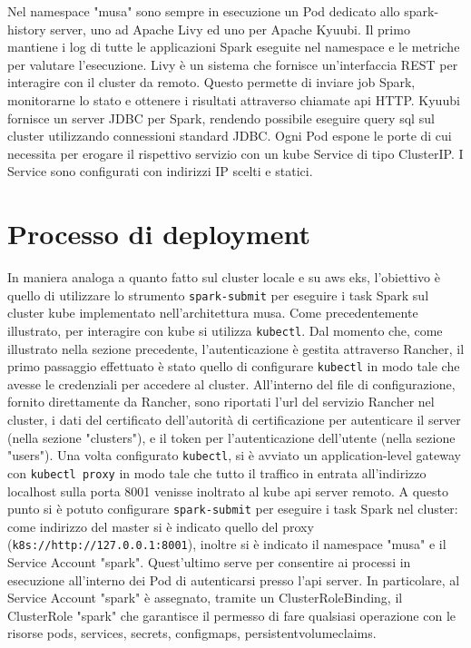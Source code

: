 \documentclass[12pt,a4paper,fleqn,titlepage]{report}
\begin{document}
        Nel namespace "musa" sono sempre in esecuzione un Pod dedicato allo spark-history server, uno ad Apache Livy ed uno per Apache Kyuubi. Il primo mantiene i log di tutte le applicazioni Spark eseguite nel namespace e le metriche per valutare l'esecuzione. Livy è un sistema che fornisce un'interfaccia REST per interagire con il \gls{cluster} da remoto. Questo permette di inviare job Spark, monitorarne lo stato e ottenere i risultati attraverso chiamate \gls{api} HTTP. Kyuubi fornisce un server JDBC per Spark, rendendo possibile eseguire query \gls{sql} sul \gls{cluster} utilizzando connessioni standard JDBC.
        Ogni Pod espone le porte di cui necessita per erogare il rispettivo servizio con un \gls{kube} Service di tipo ClusterIP. I Service sono configurati con indirizzi IP scelti e statici.

    \section{Processo di deployment}\label{sec:deplmusa}
        In maniera analoga a quanto fatto sul \gls{cluster} locale e su \gls{aws} \gls{eks}, l'obiettivo è quello di utilizzare lo strumento \lstinline{spark-submit} per eseguire i task Spark sul \gls{cluster} \gls{kube} implementato nell'architettura \gls{musa}.
        Come precedentemente illustrato, per interagire con \gls{kube} si utilizza \lstinline{kubectl}. Dal momento che, come illustrato nella sezione precedente, l'autenticazione è gestita attraverso Rancher, il primo passaggio effettuato è stato quello di configurare \lstinline{kubectl} in modo tale che avesse le credenziali per accedere al \gls{cluster}. All'interno del file di configurazione, fornito direttamente da Rancher, sono riportati l'\gls{url} del servizio Rancher nel \gls{cluster}, i dati del certificato dell'autorità di certificazione per autenticare il server (nella sezione "clusters"), e il token per l'autenticazione dell'utente (nella sezione "users").
        Una volta configurato \lstinline{kubectl}, si è avviato un application-level gateway con \lstinline{kubectl proxy} in modo tale che tutto il traffico in entrata all'indirizzo localhost sulla porta 8001 venisse inoltrato al \gls{kube} \gls{api} server remoto.
        A questo punto si è potuto configurare \lstinline{spark-submit} per eseguire i task Spark nel \gls{cluster}: come indirizzo del master si è indicato quello del proxy (\lstinline{k8s://http://127.0.0.1:8001}), inoltre si è indicato il namespace "musa" e il Service Account "spark". Quest'ultimo serve per consentire ai processi in esecuzione all'interno dei Pod di autenticarsi presso l'\gls{api} server. In particolare, al Service Account "spark" è assegnato, tramite un ClusterRoleBinding, il ClusterRole "spark" che garantisce il permesso di fare qualsiasi operazione con le risorse pods, services, secrets, configmaps, persistentvolumeclaims.
\end{document}
